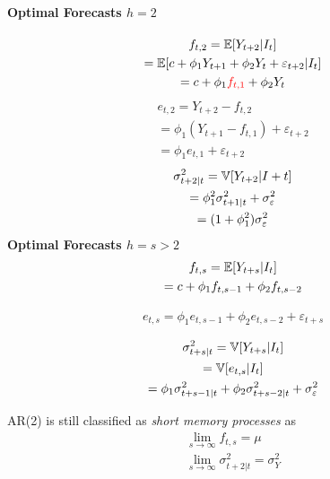 \documentclass[11pt]{article}
\begin{document}
			\paragraph{Optimal Forecasts $h=2$}
				\begin{gather}
					f_{t,2} = \mathbb{E}[{Y_{t+2}|I_t}] \\
					= \mathbb{E}[{c + \phi_1 Y_{t+1} + \phi_2 Y_t + \varepsilon_{t+2}|I_t}] \\
					= c + \phi_1 \textcolor{red}{f_{t,1}} + \phi_2 Y_t 
				\end{gather}
				\begin{gather}
					e_{t,2} = Y_{t+2} - f_{t,2} \\
					= \phi_1 (Y_{t+1} - f_{t,1}) + \varepsilon_{t+2} \\
					= \phi_1 e_{t,1} + \varepsilon_{t+2}
				\end{gather}
				\begin{gather}
					\sigma_{t+2|t}^2 = \mathbb{V}[{Y_{t+2}|I+t}] \\
					= \phi_1^2 \sigma_{t+1|t}^2 + \sigma_\varepsilon^2 \\
					= (1 + \phi_1^2) \sigma_\varepsilon^2
				\end{gather}
			\textbf{Optimal Forecasts $h=s>2$}
				\begin{gather}
					f_{t, s} = \mathbb{E}[{Y_{t+s}|I_t}] \\
					= c + \phi_1 f_{t, s-1} + \phi_2 f_{t, s-2}
				\end{gather}
				
				\begin{gather}
					e_{t, s} = \phi_1 e_{t, s-1} + \phi_2 e_{t, s-2} + \varepsilon_{t+s}
				\end{gather}
				
				\begin{gather}
					\sigma_{t+s|t}^2 = \mathbb{V}[{Y_{t+s}|I_t}] \\
					= \mathbb{V}[{e_{t,s}|I_t}] \\
					= \phi_1 \sigma_{t+s-1|t}^2 + \phi_2 \sigma_{t+s-2|t}^2 + \sigma_\varepsilon^2
				\end{gather}
			\begin{remark}
				AR(2) is still classified as \emph{short memory processes} as 
				\begin{gather}
					\lim_{s \to \infty} f_{t, s} = \mu \\
					\lim_{s \to \infty} \sigma_{t+2|t}^2 = \sigma_Y^2
				\end{gather}
			\end{remark}
			
\end{document}
